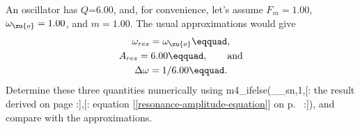 An oscillator has $Q$=6.00, and, for convenience, let's assume $F_m=1.00$, $\omega_\zu{o}=1.00$,
        and $m=1.00$. The usual approximations would give
        \begin{gather*}
                \omega_{res} =\omega_\zu{o}\eqquad,\\
                A_{res}=6.00\eqquad, \qquad \text{and}\\
                \Delta\omega=1/6.00\eqquad.
        \end{gather*}
        Determine these three quantities numerically using 
        m4_ifelse(__sn,1,[:%
        the result derived on page \pageref{misc:steadystate}
        :],[:%
        equation [\ref{resonance-amplitude-equation}] on p.~\pageref{resonance-amplitude-equation}
        :]), and
        compare with the approximations.
